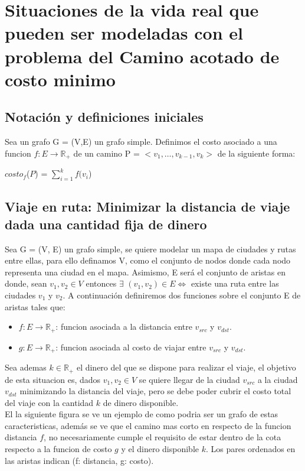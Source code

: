 \section{Situaciones de la vida real que pueden ser modeladas con el problema del Camino acotado de costo minimo}
\subsection{Notaci\'on y definiciones iniciales}
Sea un grafo G = (V,E) un grafo simple. Definimos el costo asociado a una funcion $f:E \rightarrow \mathbb{R}_+$ de un camino P = $<v_{1}, \dots, v_{k-1}, v_{k}>$ de la siguiente forma:
\begin{center}
	$costo_f$($P$) = $\sum_{i=1}^{k} f(v_i$)
\end{center}

\subsection{Viaje en ruta: Minimizar la distancia de viaje dada una cantidad fija de dinero}
Sea G = (V, E) un grafo simple, se quiere modelar un mapa de ciudades y rutas entre ellas, para ello definamos V, como el conjunto de nodos donde cada nodo representa una ciudad en el mapa. Asimismo, E ser\'a el conjunto de aristas en donde, sean $v_1,v_2 \in V $ entonces $\exists $ $(v_1,v_2) \in E \Leftrightarrow$ existe una ruta entre las ciudades $v_{1}$ y $v_{2}$. A continuaci\'on definiremos dos funciones sobre el conjunto E de aristas tales que:
\begin{itemize}
	\item $f:E \rightarrow \mathbb{R}_+$: funcion asociada a la distancia entre $v_{src}$ y $v_{dst}$.
	\item $g:E \rightarrow \mathbb{R}_+$: funcion asociada al costo de viajar entre $v_{src}$ y $v_{dst}$.
\end{itemize}
Sea ademas $k \in \mathbb{R}_+$ el dinero del que se dispone para realizar el viaje, el objetivo de esta situacion es, dados $v_1, v_2 \in V$ se quiere llegar de la ciudad $v_{src}$ a la ciudad $v_{dst}$ minimizando la distancia del viaje, pero se debe poder cubrir el costo total del viaje con la cantidad $k$ de dinero disponible.\\
El la siguiente figura se ve un ejemplo de como podria ser un grafo de estas caracteristicas, adem\'as se ve que el camino mas corto en respecto de la funcion distancia $f$, no necesariamente
cumple el requisito de estar dentro de la cota respecto a la funcion de costo $g$ y el dinero disponible $k$. Los pares ordenados en las aristas indican (f: distancia, g: costo).\\

